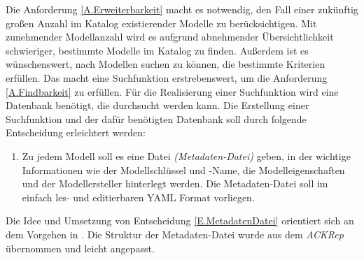 Die Anforderung \ref{A.Erweiterbarkeit} macht es notwendig, den Fall einer zukünftig großen Anzahl im Katalog existierender Modelle zu berücksichtigen. Mit zunehmender Modellanzahl wird es aufgrund abnehmender Übersichtlichkeit schwieriger, bestimmte Modelle im Katalog zu finden. Außerdem ist es wünschenswert, nach Modellen suchen zu können, die bestimmte Kriterien erfüllen. Das macht eine Suchfunktion erstrebenswert,  um die Anforderung \ref{A.Findbarkeit} zu erfüllen. Für die Realisierung einer Suchfunktion wird eine Datenbank benötigt, die durchsucht werden kann. Die Erstellung einer Suchfunktion und der dafür benötigten Datenbank soll durch folgende Entscheidung erleichtert werden:
\begin{enumerate}[label=\textbf{Entscheidung E.\arabic*}:, ref=\textbf{E.\arabic*}, wide=0pt, leftmargin=*]
	\item \label{E.MetadatenDatei}Zu jedem Modell soll es eine Datei \textit{(Metadaten-Datei)} geben, in der wichtige Informationen wie der Modellschlüssel und -Name, die Modelleigenschaften und der Modellersteller hinterlegt werden. Die Metadaten-Datei soll im einfach les- und editierbaren YAML Format vorliegen.
\end{enumerate}
Die Idee und Umsetzung von Entscheidung \ref{E.MetadatenDatei} orientiert sich an dem Vorgehen in \cite{KNHE20a}. Die Struktur der Metadaten-Datei wurde aus dem \textit{ACKRep} übernommen und leicht angepasst.


